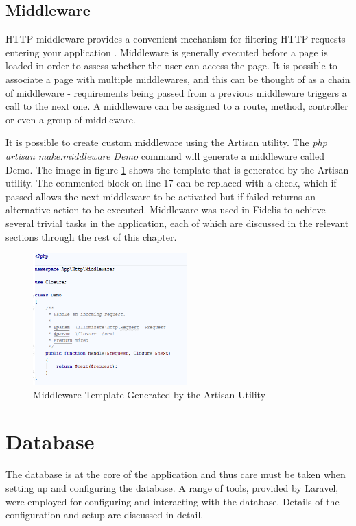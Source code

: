 \subsection{Middleware}
HTTP middleware provides a convenient mechanism for filtering HTTP requests entering your application \cite{Laravel:Middleware}. Middleware is generally executed before a page is loaded in order to assess whether the user can access the page. It is possible to associate a page with multiple middlewares, and this can be thought of as a chain of middleware - requirements being passed from a previous middleware triggers a call to the next one. A middleware can be assigned to a route, method, controller or even a group of middleware.

It is possible to create custom middleware using the Artisan utility. The \textit{php artisan make:middleware Demo} command will generate a middleware called Demo. The image in figure \ref{fig:MiddlewareTemplate} shows the template that is generated by the Artisan utility. The commented block on line 17 can be replaced with a check, which if passed allows the next middleware to be activated but if failed returns an alternative action to be executed. Middleware was used in Fidelis to achieve several trivial tasks in the application, each of which are discussed in the relevant sections through the rest of this chapter.

\begin{figure}[H]
	\centering
	\includegraphics[height=2in]{Images/Implementation/MiddlewareTemplate}
	\caption{Middleware Template Generated by the Artisan Utility} \label{fig:MiddlewareTemplate}
\end{figure}

\section{Database}
The database is at the core of the application and thus care must be taken when setting up and configuring the database. A range of tools, provided by Laravel, were employed for configuring and interacting with the database. Details of the configuration and setup are discussed in detail.

